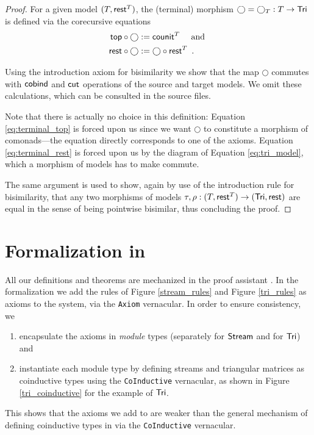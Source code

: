 \documentclass[a4paper,USenglish]{lipics}
\newcommand{\parencite}[1]{\cite{#1}}
\begin{document}
\begin{proof}
   For a given model $(T,\mathsf{rest}^T)$, the (terminal) morphism $\bigcirc = \bigcirc_T:T\to\mathsf{Tri}$ is defined via the corecursive equations
% 
   \begin{align}  {\ensuremath{\mathsf{top}}} \circ {\bigcirc} &:= \mathsf{counit}^T \quad \text{ and } \label{eq:terminal_top}\\
                   {\mathsf{rest}} \circ {\bigcirc} &:= {\bigcirc} \circ {\ensuremath{\mathsf{rest}}^T} \enspace . \label{eq:terminal_rest}
    \end{align}

  \noindent
      Using the introduction axiom for bisimilarity we show that the map $\bigcirc$ commutes with $\mathsf{cobind}$ and $\mathsf{cut}$ operations of the source and 
   target models. We omit these calculations, which can be consulted in the \coq source files.
   
   Note that there is actually no choice in this definition: Equation \eqref{eq:terminal_top} is forced upon us since we want $\bigcirc$ to constitute 
   a morphism of comonads---the equation directly corresponds to one of the axioms.
   Equation \eqref{eq:terminal_rest} is forced upon us by the diagram of Equation \eqref{eq:tri_model}, which a morphism of models has to make commute.
   
   The same argument is used to show, again by use of the introduction rule for bisimilarity, that any two morphisms of models $\tau,\rho : (T,\mathsf{rest}^T) \to (\mathsf{Tri},\mathsf{rest})$
   are equal in the sense of being pointwise bisimilar, thus concluding the proof.   
\end{proof}



\section{Formalization in \coq}\label{sec:formal}

All our definitions and theorems are mechanized in the proof assistant \coq \parencite{coq84pl6}.
In the formalization we add the rules of Figure \ref{stream_rules} and Figure \ref{tri_rules} as axioms to the \coq system, via the \lstinline!Axiom! vernacular. In order to ensure consistency, we 
\begin{enumerate}
 \item encapsulate the axioms in \coq \emph{module} types (separately for $\mathsf{Stream}$ and for $\mathsf{Tri}$) and
 \item instantiate each module type by defining streams and triangular matrices as coinductive types using the \lstinline!CoInductive! vernacular,
  as shown in Figure \ref{tri_coinductive} for the example of $\mathsf{Tri}$.
\end{enumerate}
This shows that the axioms we add to \coq are weaker than the general mechanism of defining coinductive types in \coq via the \lstinline!CoInductive! vernacular.
\end{document}
